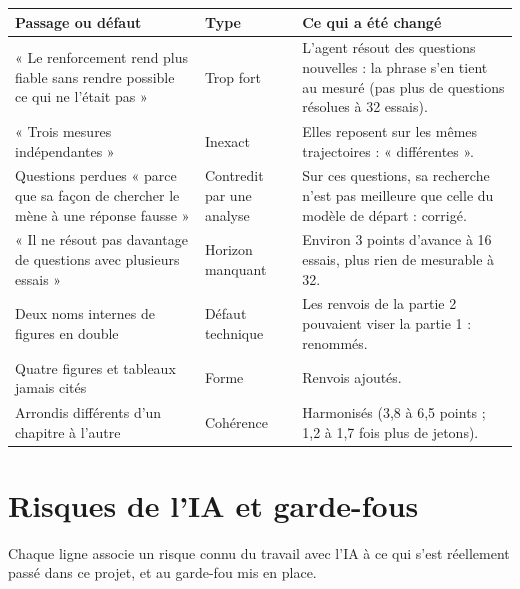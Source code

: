 \documentclass[10pt,a4paper]{article}
\begin{document}
\small
\begin{longtable}{@{}P{5.6cm}P{3cm}P{7cm}@{}}
\toprule
Passage ou défaut & Type & Ce qui a été changé\\
\midrule\endhead
« Le renforcement rend plus fiable sans rendre possible ce qui ne l'était pas » & Trop fort & L'agent résout des questions nouvelles : la phrase s'en tient au mesuré (pas plus de questions résolues à 32 essais).\\
« Trois mesures indépendantes » & Inexact & Elles reposent sur les mêmes trajectoires : « différentes ».\\
Questions perdues « parce que sa façon de chercher le mène à une réponse fausse » & Contredit par une analyse & Sur ces questions, sa recherche n'est pas meilleure que celle du modèle de départ : corrigé.\\
« Il ne résout pas davantage de questions avec plusieurs essais » & Horizon manquant & Environ 3 points d'avance à 16 essais, plus rien de mesurable à 32.\\
Deux noms internes de figures en double & Défaut technique & Les renvois de la partie 2 pouvaient viser la partie 1 : renommés.\\
Quatre figures et tableaux jamais cités & Forme & Renvois ajoutés.\\
Arrondis différents d'un chapitre à l'autre & Cohérence & Harmonisés (3,8 à 6,5 points ; 1,2 à 1,7 fois plus de jetons).\\
\bottomrule
\end{longtable}
\normalsize

\section{Risques de l'IA et garde-fous}

Chaque ligne associe un risque connu du travail avec l'IA à ce qui s'est réellement passé dans ce projet, et au garde-fou mis en place.
\end{document}
